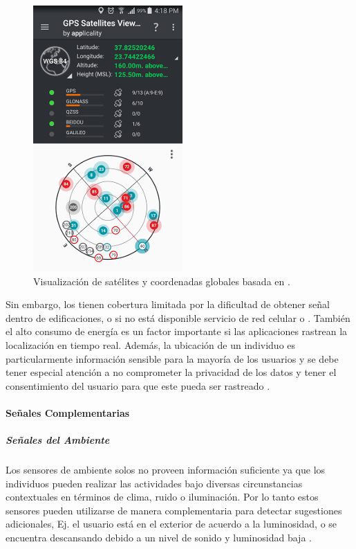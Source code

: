 \begin{figure}[!tbph]
\begin{centering}
\includegraphics[scale=0.8]{capitulo-4/graphics/gps}
\par\end{centering}
\caption[Coordenadas por GPS]{\label{fig4:gps}Visualización de satélites y coordenadas globales
basada en .}
\end{figure}

Sin embargo, los  tienen cobertura limitada por la dificultad
de obtener señal dentro de edificaciones, o si no está disponible
servicio de red celular o . También el alto consumo de
energía es un factor importante si las aplicaciones rastrean la localización
en tiempo real. Además, la ubicación de un individuo es particularmente
información sensible para la mayoría de los usuarios y se debe tener
especial atención a no comprometer la privacidad de los datos y tener
el consentimiento del usuario para que este pueda ser rastreado \cite{LaraLabrador2013}.

\paragraph{Señales Complementarias}

\subparagraph{Señales del Ambiente}

Los sensores de ambiente solos no proveen información suficiente ya
que los individuos pueden realizar las actividades bajo diversas circunstancias
contextuales en términos de clima, ruido o iluminación. Por lo tanto
estos sensores pueden utilizarse de manera complementaria para detectar
sugestiones adicionales, Ej. el usuario está en el exterior de acuerdo
a la luminosidad, o se encuentra descansando debido a un nivel de
sonido y luminosidad baja \cite{LaraLabrador2013}.

